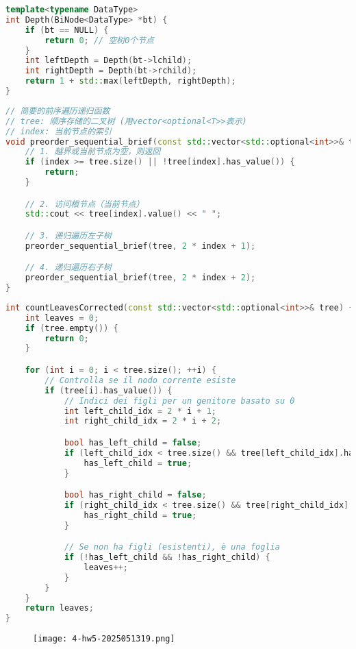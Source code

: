 \begin{lstlisting}[language=C++]
template<typename DataType>
int Depth(BiNode<DataType> *bt) {
    if (bt == NULL) {
        return 0; // 空树0个节点
    }
    int leftDepth = Depth(bt->lchild);
    int rightDepth = Depth(bt->rchild);
    return 1 + std::max(leftDepth, rightDepth);
}
\end{lstlisting}
\begin{lstlisting}[language=C++]
// 简要的前序遍历递归函数
// tree: 顺序存储的二叉树 (用vector<optional<T>>表示)
// index: 当前节点的索引
void preorder_sequential_brief(const std::vector<std::optional<int>>& tree, int index) {
    // 1. 越界或当前节点为空，则返回
    if (index >= tree.size() || !tree[index].has_value()) {
        return;
    }

    // 2. 访问根节点（当前节点）
    std::cout << tree[index].value() << " ";

    // 3. 递归遍历左子树
    preorder_sequential_brief(tree, 2 * index + 1);

    // 4. 递归遍历右子树
    preorder_sequential_brief(tree, 2 * index + 2);
}

\end{lstlisting}
\begin{lstlisting}[language=C++]
int countLeavesCorrected(const std::vector<std::optional<int>>& tree) {
    int leaves = 0;
    if (tree.empty()) {
        return 0;
    }

    for (int i = 0; i < tree.size(); ++i) {
        // Controlla se il nodo corrente esiste
        if (tree[i].has_value()) {
            // Indici dei figli per un genitore basato su 0
            int left_child_idx = 2 * i + 1;
            int right_child_idx = 2 * i + 2;

            bool has_left_child = false;
            if (left_child_idx < tree.size() && tree[left_child_idx].has_value()) {
                has_left_child = true;
            }

            bool has_right_child = false;
            if (right_child_idx < tree.size() && tree[right_child_idx].has_value()) {
                has_right_child = true;
            }

            // Se non ha figli (esistenti), è una foglia
            if (!has_left_child && !has_right_child) {
                leaves++;
            }
        }
    }
    return leaves;
}
\end{lstlisting}
\begin{figure}[H]
\centering
\texttt{[image: 4-hw5-2025051319.png]}
\label{}
\end{figure}

